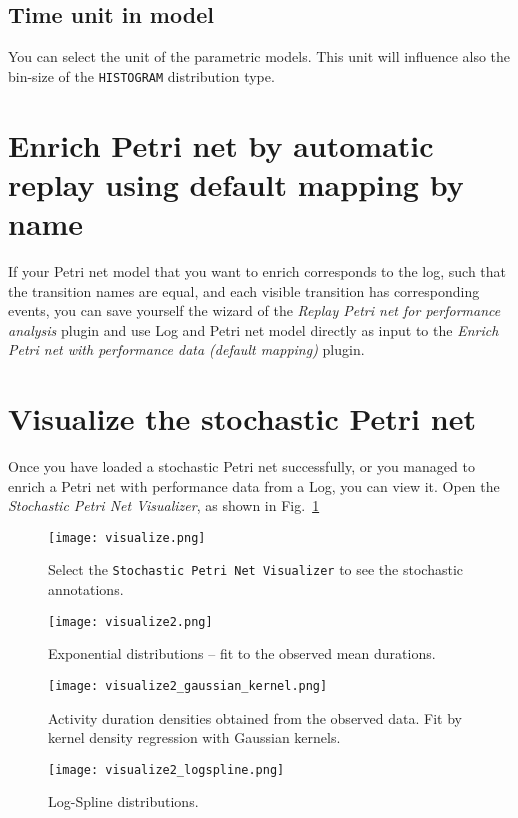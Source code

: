 \subsection*{Time unit in model}
You can select the unit of the parametric models. This unit will influence also the bin-size of the \texttt{HISTOGRAM} distribution type.

\section*{Enrich Petri net by automatic replay using default mapping by name}
If your Petri net model that you want to enrich corresponds to the log, such that the transition names are equal, and each visible transition has corresponding events, you can save yourself the wizard of the \emph{Replay Petri net for performance analysis} plugin and use Log and Petri net model directly as input to the \emph{Enrich Petri net with performance data (default mapping)} plugin.


\section*{Visualize the stochastic Petri net}
Once you have loaded a stochastic Petri net successfully, or you managed to enrich a Petri net with performance data from a Log,
you can view it. Open the \emph{Stochastic Petri Net Visualizer}, as shown in Fig.~\ref{fig:open_visualizer}

\begin{figure}[H]
\centering
\texttt{[image: visualize.png]}
\caption{Select the \texttt{Stochastic Petri Net Visualizer} to see the stochastic annotations.}
\label{fig:open_visualizer}
\end{figure}

\begin{figure}[H]
\centering
\texttt{[image: visualize2.png]}
\caption{Exponential distributions -- fit to the observed mean durations.}
\label{fig:exponential_distributions}
\end{figure}

\begin{figure}[H]
\centering
\texttt{[image: visualize2\_gaussian\_kernel.png]}
\caption{Activity duration densities obtained from the observed data. Fit by kernel density regression with Gaussian kernels.}
\label{fig:gauss_kernel}
\end{figure}

\begin{figure}[H]
\centering
\texttt{[image: visualize2\_logspline.png]}
\caption{Log-Spline distributions.}
\label{fig:log-spline_distributions}
\end{figure}